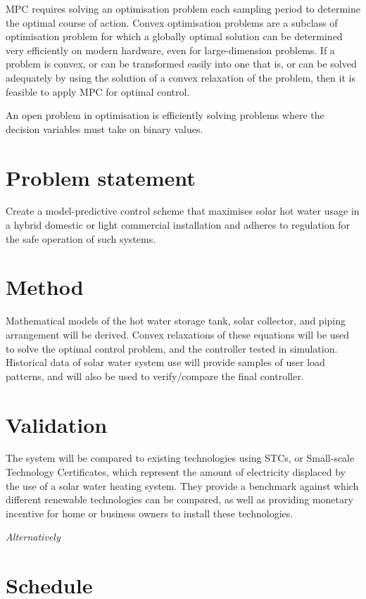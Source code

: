 \documentclass{article}
\begin{document}
MPC requires solving an optimisation problem each sampling period to determine
the optimal course of action. Convex optimisation problems are a subclass of
optimisation problem for which a globally optimal solution can be determined
very efficiently on modern hardware, even for large-dimension problems. If a
problem is convex, or can be transformed easily into one that is, or can be
solved adequately by using the solution of a convex relaxation of the problem,
then it is feasible to apply MPC for optimal control.

An open problem in optimisation is efficiently solving problems where the decision
variables must take on binary values.

\section{Problem statement}

Create a model-predictive control scheme that maximises solar hot water usage
in a hybrid domestic or light commercial installation and adheres to regulation
for the safe operation of such systems.

\section{Method}

Mathematical models of the hot water storage tank, solar collector, and piping
arrangement will be derived. Convex relaxations of these equations will be used
to solve the optimal control problem, and the controller tested in simulation.
Historical data of solar water system use will provide samples of user load
patterns, and will also be used to verify/compare the final controller.

\section{Validation}

The system will be compared to existing technologies using STCs, or Small-scale
Technology Certificates, which represent the amount of electricity displaced by
the use of a solar water heating system. \cite{CER13} They provide a benchmark
against which different renewable technologies can be compared, as well as
providing monetary incentive for home or business owners to install these
technologies.

{\it Alternatively}



\section{Schedule}



\end{document}
